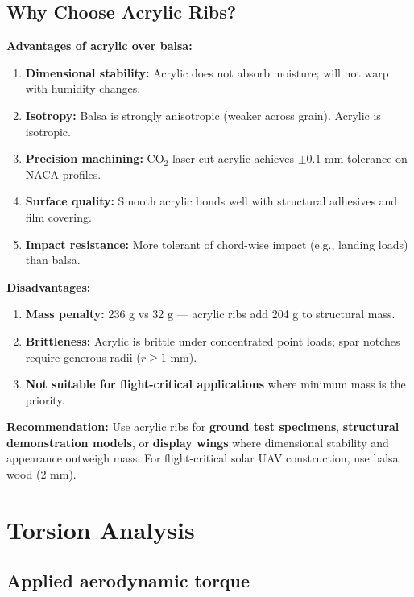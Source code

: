 \documentclass[10pt,a4paper]{article}
\begin{document}
\subsection{Why Choose Acrylic Ribs?}

\textbf{Advantages of acrylic over balsa:}
\begin{enumerate}[noitemsep,topsep=2pt]
\item \textbf{Dimensional stability:} Acrylic does not absorb moisture; will not warp with humidity changes.
\item \textbf{Isotropy:} Balsa is strongly anisotropic (weaker across grain). Acrylic is isotropic.
\item \textbf{Precision machining:} CO$_2$ laser-cut acrylic achieves $\pm$0.1 mm tolerance on NACA profiles.
\item \textbf{Surface quality:} Smooth acrylic bonds well with structural adhesives and film covering.
\item \textbf{Impact resistance:} More tolerant of chord-wise impact (e.g., landing loads) than balsa.
\end{enumerate}

\textbf{Disadvantages:}
\begin{enumerate}[noitemsep,topsep=2pt]
\item \textbf{Mass penalty:} 236 g vs 32 g --- acrylic ribs add 204 g to structural mass.
\item \textbf{Brittleness:} Acrylic is brittle under concentrated point loads; spar notches require generous radii ($r \geq 1$ mm).
\item \textbf{Not suitable for flight-critical applications} where minimum mass is the priority.
\end{enumerate}

\textbf{Recommendation:} Use acrylic ribs for \textbf{ground test specimens}, \textbf{structural demonstration models}, or \textbf{display wings} where dimensional stability and appearance outweigh mass. For flight-critical solar UAV construction, use balsa wood (2 mm).

\newpage \section{Torsion Analysis}

\subsection{Applied aerodynamic torque}
\end{document}
